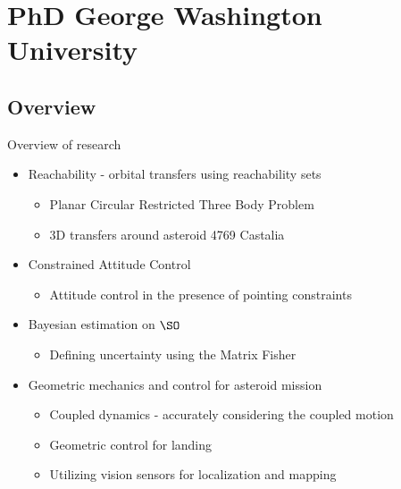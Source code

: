 
\section[PhD Research]{PhD George Washington University}

\subsection[Overview]{Overview}

\begin{frame}{Overview of research}
    \begin{itemize}
        \item Reachability - orbital transfers using reachability sets
            \begin{itemize}
                \item Planar Circular Restricted Three Body Problem
                \item 3D transfers around asteroid 4769 Castalia 
            \end{itemize}
        \pause
        \item Constrained Attitude Control
            \begin{itemize}
                \item Attitude control in the presence of pointing constraints
            \end{itemize}
        \item Bayesian estimation on \( \SO \)
            \begin{itemize}
                \item Defining uncertainty using the Matrix Fisher
            \end{itemize}
        \pause
        \item Geometric mechanics and control for asteroid mission
            \begin{itemize}
                \item Coupled dynamics - accurately considering the coupled motion
                \item Geometric control for landing 
                \item Utilizing vision sensors for localization and mapping
            \end{itemize}
    \end{itemize}
\end{frame}


